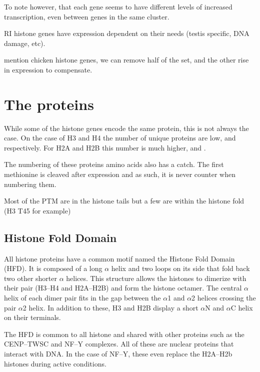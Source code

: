 \documentclass[10pt,a4paper,twocolumn,article]{memoir}
\begin{document}
      To note however, that each gene seems to have different levels of increased transcription, even between genes in the
      same cluster.

      RI histone genes have expression dependent on their needs (testis specific, DNA damage, etc).

      mention chicken histone genes, we can remove half of the set, and the other rise in expression to compensate.


  \section{The proteins}
    While some of the histone genes encode the same protein, this is not always the
    case. On the case of H3 and H4 the number of unique proteins are low, \TotalHThree{}
    and \TotalHFour{} respectively. For H2A and H2B this number is much higher, \TotalHTwoA{}
    and \TotalHTwoB{}.

    The numbering of these proteins amino acids also has a catch. The first methionine
    is cleaved after expression and as such, it is never counter when numbering them.

    Most of the PTM are in the histone tails but a few are within the histone fold (H3 T45 for example)

    \subsection{Histone Fold Domain}

      All histone proteins have a common motif named the Histone Fold Domain (HFD).
      It is composed of a long $\alpha$ helix and two loops on its side that fold
      back two other shorter $\alpha$ helices. This structure allows the histones
      to dimerize with their pair (H3--H4 and H2A--H2B) and form the histone
      octamer. The central $\alpha$ helix of each dimer pair fits in the gap between
      the $\alpha$1 and $\alpha$2 helices crossing the pair $\alpha$2 helix. In
      addition to these, H3 and H2B display a short $\alpha$N and $\alpha$C helix
      on their terminals.

      The HFD is common to all histone and shared with other
      proteins such as the CENP--TWSC and NF--Y complexes. All of these are nuclear
      proteins that interact with DNA. In the case of NF--Y, these even replace
      the H2A--H2b histones during active conditions.
\end{document}
